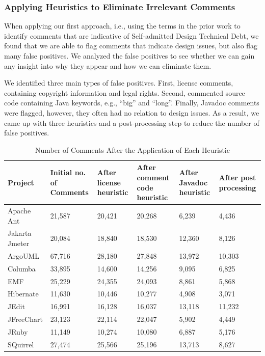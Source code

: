 \documentclass[conference]{IEEEtran}
\newcommand{\SADTD}{Self-admitted Design Technical Debt\xspace}
\begin{document}
\subsubsection{Applying Heuristics to Eliminate Irrelevant Comments}

When applying our first approach, i.e., using the terms in the prior work to identify comments that are indicative of \SADTD, we found that we are able to flag comments that indicate design issues, but also flag many false positives. We analyzed the false positives to see whether we can gain any insight into why they appear and how we can eliminate them. 

We identified three main types of false positives. First, license comments, containing copyright information and legal rights. Second, commented source code containing Java keywords, e.g., ``big'' and ``long''. Finally, Javadoc comments were flagged, however, they often had no relation to design issues. As a result, we came up with three heuristics and a post-processing step to reduce the number of false positives.

\begin{table}[!hbt]
	\begin{center}
		\caption{Number of Comments After the Application of Each Heuristic}
		\vspace{-2mm}
		\label{tab:heuristicDetails}
		\begin{tabular}{l| p{.6in} p{.6in} p{.8in} p{.7in} p{.55in}} 
			\toprule
			\textbf{Project} & 	\textbf{Initial no. of Comments} & \textbf{After license heuristic} &  \textbf{After comment code heuristic}  &  \textbf{After Javadoc heuristic} & \textbf{After post processing} \\ 
			\midrule
			Apache Ant & 21,587 & 20,421 & 20,268 & 6,239 & 4,436 \\ 
			Jakarta Jmeter & 20,084& 18,840 & 18,530 & 12,360 & 8,126 \\
			ArgoUML & 67,716 & 28,180 & 27,848 & 13,972 & 10,303 \\
			Columba & 33,895 & 14,600 & 14,256 & 9,095 & 6,825 \\
			EMF & 25,229 & 24,355 & 24,093 & 8,861 & 5,868 \\
			Hibernate  & 11,630 & 10,446 & 10,277 & 4,908 & 3,071 \\
			JEdit & 16,991 & 16,128 & 16,037 & 13,118 & 11,232 \\
			JFreeChart & 23,123 & 22,114 & 22,047 & 5,902 & 4,449 \\
			JRuby & 11,149 & 10,274 & 10,080 & 6,887 & 5,176 \\
			SQuirrel  & 27,474& 25,566 & 25,196 & 13,713 & 8,627 \\  
			\bottomrule
		\end{tabular}
	\end{center}
\end{table}
  
\end{document}

